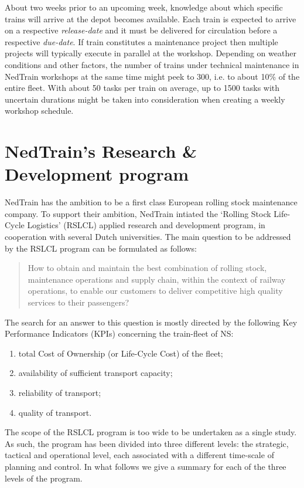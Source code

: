 		About two weeks prior to an upcoming week, knowledge about which specific trains will arrive at the depot becomes available. 
		Each train is expected to arrive on a respective \emph{release-date} and 
		it must be delivered for circulation before a respective \emph{due-date}.
		If train constitutes a maintenance project then multiple projects will typically execute in parallel at the workshop.
		Depending on weather conditions and other factors, the number of trains under technical maintenance in 
		NedTrain workshops at the same time might peek to 300, i.e. to about 10\% of the entire fleet. 
		With about 50 tasks per train on average,
		up to 1500 tasks with uncertain durations might be taken into consideration when creating a weekly workshop schedule.
		
\section{NedTrain's Research \& Development program}

	NedTrain has the ambition to be a first class European rolling stock maintenance company. 
	To support their ambition, NedTrain intiated the `Rolling Stock Life-Cycle Logistics' (RSLCL) 
	applied research and development program, in cooperation with several Dutch universities.
	The main question to be addressed by the RSLCL program can be formulated as follows:
	\begin{quote}
		How to obtain and maintain the best combination of rolling stock, maintenance
		operations and supply chain, within the context of railway operations, to enable
		our customers to deliver competitive high quality services to their passengers? \cite{huisman2009}
	\end{quote}

	The search for an answer to this question is mostly directed by the following
	Key Performance Indicators (KPIs) concerning the train-fleet of NS:
	\begin{enumerate}
		\item total Cost of Ownership (or Life-Cycle Cost) of the fleet;
		\item availability of sufficient transport capacity;
		\item reliability of transport;
		\item quality of transport.
	\end{enumerate}
	
	The scope of the RSLCL program is too wide to be undertaken as a single study.
	As such, the program has been divided into three different levels:
	the strategic, tactical and operational level,
	each associated with a different time-scale of planning and control.
	In what follows we give a summary for each of the three levels of the program.
	
